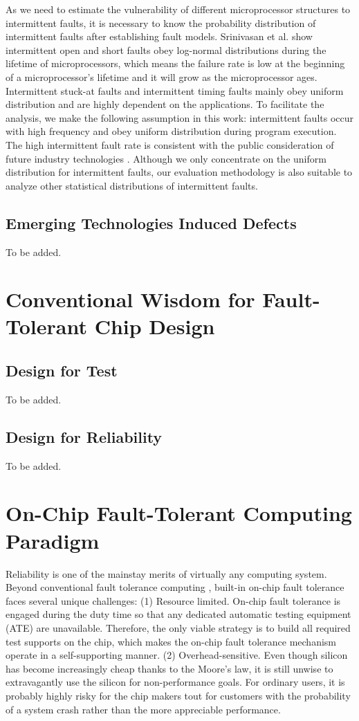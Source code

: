 As we need to estimate the vulnerability of different microprocessor structures to intermittent faults, it is necessary to know the probability distribution of intermittent faults after establishing fault models. Srinivasan et al. \cite{srinivasan2005exploiting} show intermittent open and short faults obey log-normal distributions during the lifetime of microprocessors, which means the failure rate is low at the beginning of a microprocessor’s lifetime and it will grow as the microprocessor ages. Intermittent stuck-at faults and intermittent timing faults mainly obey uniform distribution and are highly dependent on the applications. To facilitate the analysis, we make the following assumption in this work: intermittent faults occur with high frequency and obey uniform distribution during program execution. The high intermittent fault rate is consistent with the public consideration of future industry technologies \cite{borkar2003parameter}. Although we only concentrate on the uniform distribution for intermittent faults, our evaluation methodology is also suitable to analyze other statistical distributions of intermittent faults.

\subsection{Emerging Technologies Induced Defects}
To be added.

\section{Conventional Wisdom for Fault-Tolerant Chip Design}
\subsection{Design for Test}
To be added.

\subsection{Design for Reliability}
To be added.

\section{On-Chip Fault-Tolerant Computing Paradigm}
Reliability is one of the mainstay merits of virtually any computing system. Beyond conventional fault tolerance computing \cite{borkar2005designing}, built-in on-chip fault tolerance faces several unique challenges: (1) Resource limited. On-chip fault tolerance is engaged during the duty time so that any dedicated automatic testing equipment (ATE) are unavailable. Therefore, the only viable strategy is to build all required test supports on the chip, which makes the on-chip fault tolerance mechanism operate in a self-supporting manner. (2) Overhead-sensitive. Even though silicon has become increasingly cheap thanks to the Moore's law, it is still unwise to extravagantly use the silicon for non-performance goals. For ordinary users, it is probably highly risky for the chip makers tout for customers with the probability of a system crash rather than the more appreciable performance.

